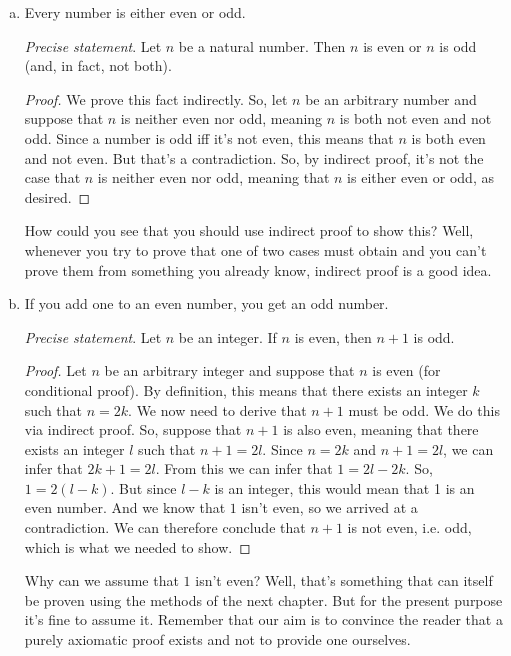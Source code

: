 \begin{enumerate}
\begin{enumerate}[(a)]
			How could you have seen that contrapositive proof is a good strategy here? Well, whenever you have a conditional with a disjunction in the then-part, it's a good idea to try contrapositive proof. 
			
			\item Every number is either even or odd.
			
				\emph{Precise statement}. Let $n$ be a natural number. Then $n$ is even or $n$ is odd (and, in fact, not both).
				
				\begin{proof}
				We prove this fact indirectly. So, let $n$ be an arbitrary number and suppose that $n$ is neither even nor odd, meaning $n$ is both not even and not odd. Since a number is odd iff it's not even, this means that $n$ is both even and not even. But that's a contradiction. So, by indirect proof, it's not the case that $n$ is neither even nor odd, meaning that $n$ is either even or odd, as desired.
				\end{proof}
				
			How could you see that you should use indirect proof to show this? Well, whenever you try to prove that one of two cases must obtain and you can't prove them from something you already know, indirect proof is a good idea.
			
			\item If you add one to an even number, you get an odd number.
			
				\emph{Precise statement}. Let $n$ be an integer. If $n$ is even, then $n+1$ is odd.
				
				\begin{proof}
				Let $n$ be an arbitrary integer and suppose that $n$ is even (for conditional proof). By definition, this means that there exists an integer $k$ such that $n=2k$. We now need to derive that $n+1$ must be odd. We do this via indirect proof. So, suppose that $n+1$ is also even, meaning that there exists an integer $l$ such that $n+1=2l$. Since $n=2k$ and $n+1=2l$, we can infer that $2k+1=2l$. From this we can infer that $1=2l-2k$. So, $1=2(l-k)$. But since $l-k$ is an integer, this would mean that 1 is an even number. And we know that $1$ isn't even, so we arrived at a contradiction. We can therefore conclude that $n+1$ is not even, i.e. odd, which is what we needed to show.
				\end{proof}
				
			Why can we assume that $1$ isn't even? Well, that's something that can itself be proven using the methods of the next chapter. But for the present purpose it's fine to assume it. Remember that our aim is to convince the reader that a purely axiomatic proof exists and not to provide one ourselves.


\end{enumerate}
\end{enumerate}

